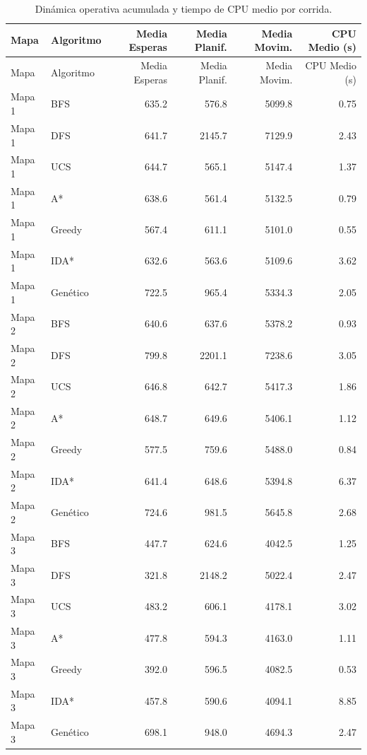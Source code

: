 \documentclass[11pt,letterpaper]{article}
\begin{document}
\small
\begin{longtable}{@{}llrrrr@{}}
\caption{Dinámica operativa acumulada y tiempo de CPU medio por corrida.}\label{tab:operativa}\\
\toprule
Mapa & Algoritmo & Media Esperas & Media Planif. & Media Movim. & CPU Medio (s) \\
\midrule
\endfirsthead
\toprule
Mapa & Algoritmo & Media Esperas & Media Planif. & Media Movim. & CPU Medio (s) \\
\midrule
\endhead
\bottomrule
\endfoot
Mapa 1 & BFS      & 635.2 &  576.8 & 5099.8 & 0.75 \\
Mapa 1 & DFS      & 641.7 & 2145.7 & 7129.9 & 2.43 \\
Mapa 1 & UCS      & 644.7 &  565.1 & 5147.4 & 1.37 \\
Mapa 1 & A*       & 638.6 &  561.4 & 5132.5 & 0.79 \\
Mapa 1 & Greedy   & 567.4 &  611.1 & 5101.0 & 0.55 \\
Mapa 1 & IDA*     & 632.6 &  563.6 & 5109.6 & 3.62 \\
Mapa 1 & Genético & 722.5 &  965.4 & 5334.3 & 2.05 \\
\midrule
Mapa 2 & BFS      & 640.6 &  637.6 & 5378.2 & 0.93 \\
Mapa 2 & DFS      & 799.8 & 2201.1 & 7238.6 & 3.05 \\
Mapa 2 & UCS      & 646.8 &  642.7 & 5417.3 & 1.86 \\
Mapa 2 & A*       & 648.7 &  649.6 & 5406.1 & 1.12 \\
Mapa 2 & Greedy   & 577.5 &  759.6 & 5488.0 & 0.84 \\
Mapa 2 & IDA*     & 641.4 &  648.6 & 5394.8 & 6.37 \\
Mapa 2 & Genético & 724.6 &  981.5 & 5645.8 & 2.68 \\
\midrule
Mapa 3 & BFS      & 447.7 &  624.6 & 4042.5 & 1.25 \\
Mapa 3 & DFS      & 321.8 & 2148.2 & 5022.4 & 2.47 \\
Mapa 3 & UCS      & 483.2 &  606.1 & 4178.1 & 3.02 \\
Mapa 3 & A*       & 477.8 &  594.3 & 4163.0 & 1.11 \\
Mapa 3 & Greedy   & 392.0 &  596.5 & 4082.5 & 0.53 \\
Mapa 3 & IDA*     & 457.8 &  590.6 & 4094.1 & 8.85 \\
Mapa 3 & Genético & 698.1 &  948.0 & 4694.3 & 2.47 \\
\end{longtable}
\normalsize
\end{document}
